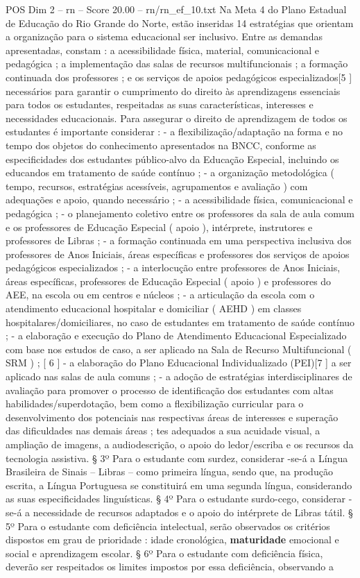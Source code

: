 \begin{textsample}{POS Dim 2 – rn – Score 20.00 – rn/rn\_ef\_10.txt}
Na Meta 4 do Plano Estadual de Educação do Rio Grande do Norte, estão inseridas 14 estratégias que orientam a organização para o sistema educacional ser inclusivo.
Entre as demandas apresentadas, constam : a acessibilidade física, material, comunicacional e pedagógica ; a implementação das salas de recursos multifuncionais ; a formação continuada dos professores ; e os serviços de apoios pedagógicos especializados[5 ] necessários para garantir o cumprimento do direito às aprendizagens essenciais para todos os estudantes, respeitadas as suas características, interesses e necessidades educacionais.
Para assegurar o direito de aprendizagem de todos os estudantes é importante considerar : - a flexibilização/adaptação na forma e no tempo dos objetos do conhecimento apresentados na BNCC, conforme as especificidades dos estudantes público-alvo da Educação Especial, incluindo os educandos em tratamento de saúde contínuo ; - a organização metodológica ( tempo, recursos, estratégias acessíveis, agrupamentos e avaliação ) com adequações e apoio, quando necessário ; - a acessibilidade física, comunicacional e pedagógica ; - o planejamento coletivo entre os professores da sala de aula comum e os professores de Educação Especial ( apoio ), intérprete, instrutores e professores de Libras ; - a formação continuada em uma perspectiva inclusiva dos professores de Anos Iniciais, áreas específicas e professores dos serviços de apoios pedagógicos especializados ; - a interlocução entre professores de Anos Iniciais, áreas específicas, professores de Educação Especial ( apoio ) e professores do AEE, na escola ou em centros e núcleos ; - a articulação da escola com o atendimento educacional hospitalar e domiciliar ( AEHD ) em classes hospitalares/domiciliares, no caso de estudantes em tratamento de saúde contínuo ; - a elaboração e execução do Plano de Atendimento Educacional Especializado com base nos estudos de caso, a ser aplicado na Sala de Recurso Multifuncional ( SRM ) ; [ 6 ] - a elaboração do Plano Educacional Individualizado (PEI)[7 ] a ser aplicado nas salas de aula comuns ; - a adoção de estratégias interdisciplinares de avaliação para promover o processo de identificação dos estudantes com altas habilidades/superdotação, bem como a flexibilização curricular para o desenvolvimento dos potenciais nas respectivas áreas de interesses e superação das dificuldades nas demais áreas ; tes adequados a sua acuidade visual, a ampliação de imagens, a audiodescrição, o apoio do ledor/escriba e os recursos da tecnologia assistiva. § 3º Para o estudante com surdez, considerar -se-á a Língua Brasileira de Sinais – Libras – como primeira língua, sendo que, na produção escrita, a Língua Portuguesa se constituirá em uma segunda língua, considerando as suas especificidades linguísticas. § 4º Para o estudante surdo-cego, considerar -se-á a necessidade de recursos adaptados e o apoio do intérprete de Libras tátil. § 5º Para o estudante com deficiência intelectual, serão observados os critérios dispostos em grau de prioridade : idade cronológica, \textbf{maturidade} emocional e social e aprendizagem escolar. § 6º Para o estudante com deficiência física, deverão ser respeitados os limites impostos por essa deficiência, observando a 
\end{textsample}
